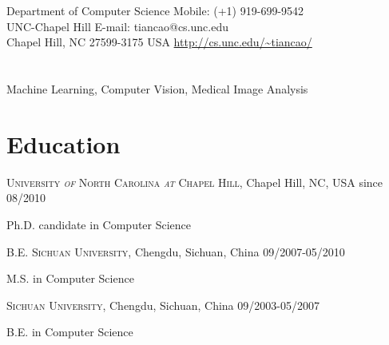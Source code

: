 \documentclass[line,margin]{res}
\newenvironment{list1}{
  \begin{list}{\ding{113}}{%
      \setlength{\itemsep}{0in}
      \setlength{\parsep}{0in} \setlength{\parskip}{0in}
      \setlength{\topsep}{0in} \setlength{\partopsep}{0in} 
      \setlength{\leftmargin}{0.17in}}}{\end{list}}
\begin{document}

\begin{resume}
\section{}
\smallskip
Department of Computer Science  \hfill { Mobile:}  (+1) 919-699-9542 \\
UNC-Chapel Hill \hfill { E-mail:}  tiancao@cs.unc.edu \\
Chapel Hill, NC 27599-3175 USA \hfill  \url{http://cs.unc.edu/~tiancao/} 

\section{}       
\smallskip

Machine Learning, Computer Vision, Medical Image Analysis

\section{\sc Education}
\smallskip

\textsc{University \textit{of} North Carolina \textit{at} Chapel Hill}, Chapel Hill, NC, USA \hfill{since 08/2010}\\
\vspace*{-.15in}
\begin{list1}
\item[] Ph.D. candidate in Computer Science %
\end{list1}
 \vspace*{-.15in}B.E.
\textsc{Sichuan University}, Chengdu, Sichuan, China \hfill {09/2007-05/2010}\\
\vspace*{-.15in}
\begin{list1}
\item[] M.S. in Computer Science  %
\end{list1}
 \vspace*{-.15in}
\textsc{Sichuan University}, Chengdu, Sichuan, China \hfill{09/2003-05/2007}\\
 \vspace*{-.15in}
\begin{list1}
 \item[]  B.E. in Computer Science %
\end{list1}


\end{resume}
\end{document}
